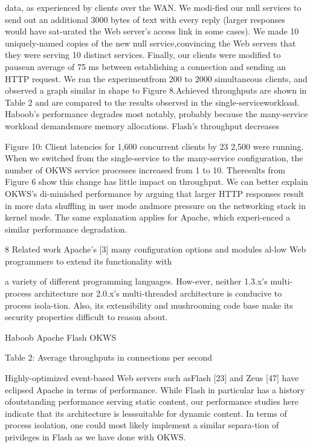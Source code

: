 data, as experienced by clients over the WAN. We modi-fied our null services to send out an additional 3000 bytes
of text with every reply (larger responses would have sat-urated the Web server's access link in some cases). We
made 10 uniquely-named copies of the new null service,convincing the Web servers that they were serving 10 distinct services. Finally, our clients were modified to pausean average of 75 ms between establishing a connection
and sending an HTTP request. We ran the experimentfrom 200 to 2000 simultaneous clients, and observed a
graph similar in shape to Figure 8.Achieved throughputs are shown in Table 2 and are
compared to the results observed in the single-serviceworkload. Haboob's performance degrades most notably,
probably because the many-service workload demandsmore memory allocations. Flash's throughput decreases

Figure 10: Client latencies for 1,600 concurrent clients
by 23%
2,500 were running. When we switched from the single-service to the many-service configuration, the number of
OKWS service processes increased from 1 to 10. Theresults from Figure 6 show this change has little impact on throughput. We can better explain OKWS's di-minished performance by arguing that larger HTTP responses result in more data shuffling in user mode andmore pressure on the networking stack in kernel mode.
The same explanation applies for Apache, which experi-enced a similar performance degradation.

8 Related work
Apache's [3] many configuration options and modules al-low Web programmers to extend its functionality with

a variety of different programming languages. How-ever, neither 1.3.x's multi-process architecture nor 2.0.x's
multi-threaded architecture is conducive to process isola-tion. Also, its extensibility and mushrooming code base
make its security properties difficult to reason about.

Haboob Apache Flash OKWS

Table 2: Average throughputs in connections per second

Highly-optimized event-based Web servers such asFlash [23] and Zeus [47] have eclipsed Apache in terms
of performance. While Flash in particular has a history ofoutstanding performance serving static content, our performance studies here indicate that its architecture is lesssuitable for dynamic content. In terms of process isolation, one could most likely implement a similar separa-tion of privileges in Flash as we have done with OKWS.

